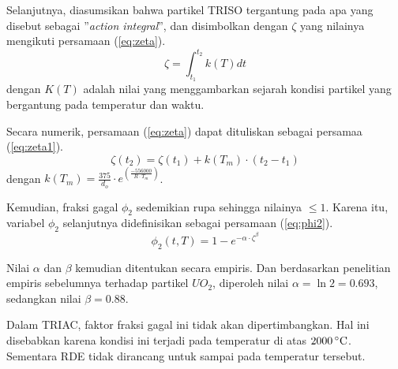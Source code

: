 \documentclass[a4paper,11pt]{report}
\begin{document}
Selanjutnya, diasumsikan bahwa partikel TRISO tergantung pada apa yang disebut sebagai ''\textit{action integral}'', dan disimbolkan dengan $\zeta$ yang nilainya mengikuti persamaan (\ref{eq:zeta}).
\begin{equation}
  \zeta=\int_{t_1}^{t_2} k(T) dt
  \label{eq:zeta}
\end{equation}
dengan $K(T)$ adalah nilai yang menggambarkan sejarah kondisi partikel yang bergantung pada temperatur dan waktu.

Secara numerik, persamaan (\ref{eq:zeta}) dapat dituliskan sebagai persamaa (\ref{eq:zeta1}).
\begin{equation}
  \zeta(t_2)=\zeta(t_1)+k(T_m) \cdot (t_2 - t_1)
  \label{eq:zeta1}
\end{equation}
dengan $k(T_m)=\frac{375}{d_o} \cdot e^{\left(\frac{-556000}{R \cdot T_m}\right)}$.

Kemudian, fraksi gagal $\phi_2$ sedemikian rupa sehingga nilainya $\leq 1$. Karena itu, variabel $\phi_2$ selanjutnya didefinisikan sebagai persamaan (\ref{eq:phi2}).
\begin{equation}
\phi_2(t,T)=1-e^{-\alpha \cdot \zeta^{\beta}}
\label{eq:phi2}
\end{equation}

Nilai $\alpha$ dan $\beta$ kemudian ditentukan secara empiris. Dan berdasarkan penelitian empiris sebelumnya terhadap partikel $UO_2$, diperoleh nilai $\alpha=\ln 2=0.693$, sedangkan nilai $\beta=0.88$.

Dalam TRIAC, faktor fraksi gagal ini tidak akan dipertimbangkan. Hal ini disebabkan karena kondisi ini terjadi pada temperatur di atas $2000\,^{\circ}{\rm C}$. Sementara RDE tidak dirancang untuk sampai pada temperatur tersebut.




\begin{appendix}
	
	\setcounter{page}{2}
	
\end{appendix}
\end{document}

